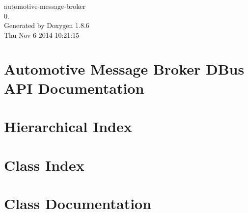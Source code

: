 \documentclass[twoside]{book}
\newcommand{\clearemptydoublepage}{%
  \newpage{\pagestyle{empty}\cleardoublepage}%
}
\begin{document}
\hypersetup{pageanchor=false}
\begin{titlepage}
\vspace*{7cm}
\begin{center}%
{\Large automotive-\/message-\/broker \\[1ex]\large 0. }\\
\vspace*{1cm}
{\large Generated by Doxygen 1.8.6}\\
\vspace*{0.5cm}
{\small Thu Nov 6 2014 10:21:15}\\
\end{center}
\end{titlepage}
\clearemptydoublepage
\tableofcontents
\clearemptydoublepage
{}
\hypersetup{pageanchor=true}

\chapter{Automotive Message Broker D\-Bus A\-P\-I Documentation}
\label{index}\hypertarget{index}{}
\chapter{Hierarchical Index}

\chapter{Class Index}

\chapter{Class Documentation}











































\end{document}
